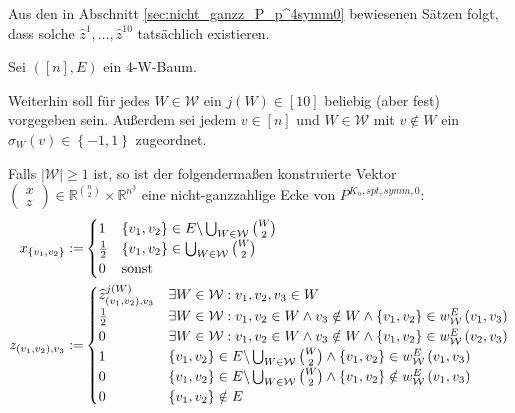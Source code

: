 \documentclass[10p,a4paper,BCOR = 12mm, DIV=15]{scrbook}
\begin{document}
{Aus den in Abschnitt \ref{sec:nicht_ganzz_P_p^4symm0} bewiesenen Sätzen folgt, dass solche $\widehat{z}^1, \ldots, \widehat{z}^{10}$ tatsächlich existieren.

\begin{Sa}
Sei $\left(\left[n\right], E\right)$ ein 4-W-Baum.

Weiterhin soll für jedes $W \in \mathcal{W}$ ein $j\left(W\right) \in\left[10\right]$ beliebig (aber fest) vorgegeben sein. Außerdem sei jedem $v \in \left[n\right]$ und $W \in \mathcal{W}$ mit $v \notin W$ ein $\sigma_{W}\left(v\right) \in \left\{-1, 1\right\}$ zugeordnet. 

Falls $\left|\mathcal{W}\right| \geq 1$ ist, so ist der folgendermaßen konstruierte Vektor $\left(
\begin{array}{c}
x \\
z
\end{array}
\right) \in \mathbb{R}^{n \choose 2} \times \mathbb{R}^{n^{\underline{3}}}$ eine nicht-ganzzahlige Ecke von $P^{K_n, spt, symm, 0}$:
{
\allowdisplaybreaks
\begin{align*}
x_{\left\{v_1, v_2\right\}} := & \begin{cases}
1 & \left\{v_1, v_2\right\} \in E \backslash \bigcup_{W \in \mathcal{W}} {W \choose 2} \\
\frac{1}{2} & \left\{v_1, v_2\right\} \in \bigcup_{W \in \mathcal{W}} {W \choose 2} \\
0 & \textnormal{sonst}
\end{cases} \\
z_{\left(v_1, v_2\right), v_3} := & \begin{cases}
\widehat{z}^{j\left(W\right)}_{\left(v_1, v_2\right), v_3} & \exists W \in \mathcal{W}: v_1, v_2, v_3 \in W \\
\frac{1}{2} & \exists W \in \mathcal{W}: v_1, v_2\in W \wedge v_3 \notin W \wedge \left\{v_1, v_2\right\} \in w_{\mathcal{W}}^E\left(v_1, v_3\right) \\
0 & \exists W \in \mathcal{W}: v_1, v_2\in W \wedge v_3 \notin W \wedge \left\{v_1, v_2\right\} \in w_{\mathcal{W}}^E\left(v_2, v_3\right) \\
1 & \left\{v_1, v_2\right\} \in E \backslash \bigcup_{W \in \mathcal{W}} {W \choose 2} \wedge \left\{v_1, v_2\right\} \in w_{\mathcal{W}}^E\left(v_1, v_3\right) \\
0 & \left\{v_1, v_2\right\} \in E \backslash \bigcup_{W \in \mathcal{W}} {W \choose 2} \wedge \left\{v_1, v_2\right\} \notin w_{\mathcal{W}}^E\left(v_1, v_3\right) \\
0 & \left\{v_1, v_2\right\} \notin E
\end{cases}
\end{align*}
}


\end{Sa}}
\end{document}
